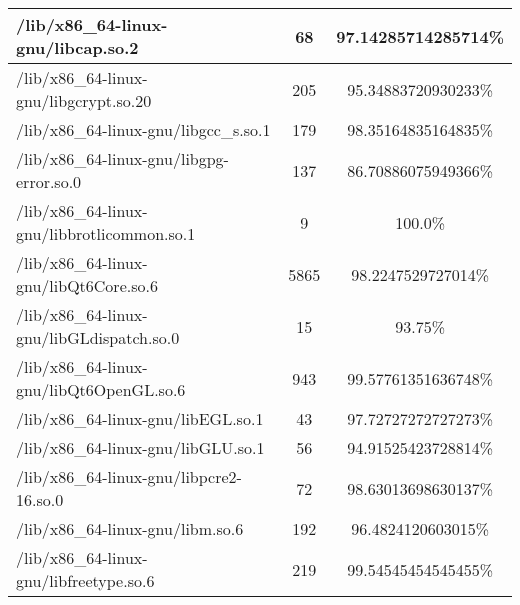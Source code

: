 \begin{table}[h]
\begin{tabular}{l|c|c}
/lib/x86\_64-linux-gnu/libcap.so.2 & 68 & 97.14285714285714\% \\ \hline
/lib/x86\_64-linux-gnu/libgcrypt.so.20 & 205 & 95.34883720930233\% \\ \hline
\colorbox{gray!20}{/lib/x86\_64-linux-gnu/libgcc\_s.so.1} & 179 & 98.35164835164835\% \\ \hline
/lib/x86\_64-linux-gnu/libgpg-error.so.0 & 137 & 86.70886075949366\% \\ \hline
/lib/x86\_64-linux-gnu/libbrotlicommon.so.1 & 9 & 100.0\% \\ \hline
\colorbox{gray!20}{/lib/x86\_64-linux-gnu/libQt6Core.so.6} & 5865 & 98.2247529727014\% \\ \hline
/lib/x86\_64-linux-gnu/libGLdispatch.so.0 & 15 & 93.75\% \\ \hline
/lib/x86\_64-linux-gnu/libQt6OpenGL.so.6 & 943 & 99.57761351636748\% \\ \hline
/lib/x86\_64-linux-gnu/libEGL.so.1 & 43 & 97.72727272727273\% \\ \hline
\colorbox{gray!20}{/lib/x86\_64-linux-gnu/libGLU.so.1} & 56 & 94.91525423728814\% \\ \hline
/lib/x86\_64-linux-gnu/libpcre2-16.so.0 & 72 & 98.63013698630137\% \\ \hline
\colorbox{gray!20}{/lib/x86\_64-linux-gnu/libm.so.6} & 192 & 96.4824120603015\% \\ \hline
/lib/x86\_64-linux-gnu/libfreetype.so.6 & 219 & 99.54545454545455\% \\ \hline
\bottomrule
\end{tabular}
\end{table}

